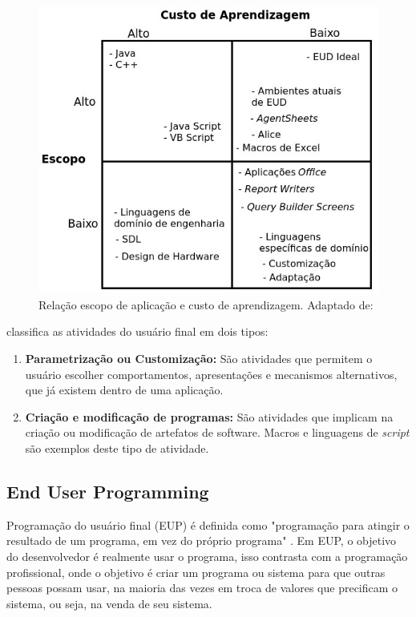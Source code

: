 \begin{figure}[h]
	\centering
		\includegraphics[scale=0.8]{figuras/trade_off_eud_editado}
	\caption{Relação escopo de aplicação e custo de aprendizagem. Adaptado de: \cite{fischer2004}}
	\label{aplicacao_custo_aprendizagem}
\end{figure}
\pagebreak

 classifica as atividades do usuário final em dois tipos:

\begin{enumerate}
\item \textbf{Parametrização ou Customização:} São atividades que permitem o usuário escolher comportamentos, apresentações e mecanismos  alternativos, que já existem dentro de uma aplicação.

\item \textbf{Criação e modificação de programas:} São atividades que implicam na criação ou modificação de artefatos de software. Macros e linguagens de \textit{script} são exemplos deste tipo de atividade.
\end{enumerate}

\subsection{End User Programming}

Programação do usuário final (EUP) é definida como "programação para atingir o resultado de um programa, em vez do próprio programa" \cite{ko2011state}. Em EUP, o objetivo do desenvolvedor é realmente usar o programa, isso contrasta com a programação profissional, onde o objetivo é criar um programa ou sistema para que outras pessoas possam usar, na maioria das vezes em troca de valores que precificam o sistema, ou seja, na venda de seu sistema.

